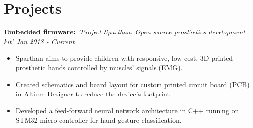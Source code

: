 \documentclass[11pt,letterpaper,sans]{moderncv}       %
\begin{document}
            

           \vspace{-13pt}
        
    \section{Projects}
    
    \vspace{-2pt}
        
        \textbf{Embedded firmware:} \textit{'Project Sparthan: Open source prosthetics development kit'
        \hspace*{\fill} Jan 2018 - Current}
        {
        \begin{itemize}
            \item Sparthan aims to provide children with responsive, low-cost, 3D printed prosthetic hands controlled by muscles' signals (EMG).
            \item Created schematics and board layout for custom printed circuit board (PCB) in Altium Designer to reduce the device's footprint.
            \item Developed a feed-forward neural network architecture in C++ running on STM32 micro-controller for hand gesture classification.
        \end{itemize}
        }
        \vspace{2pt}
        
        
\end{document}
